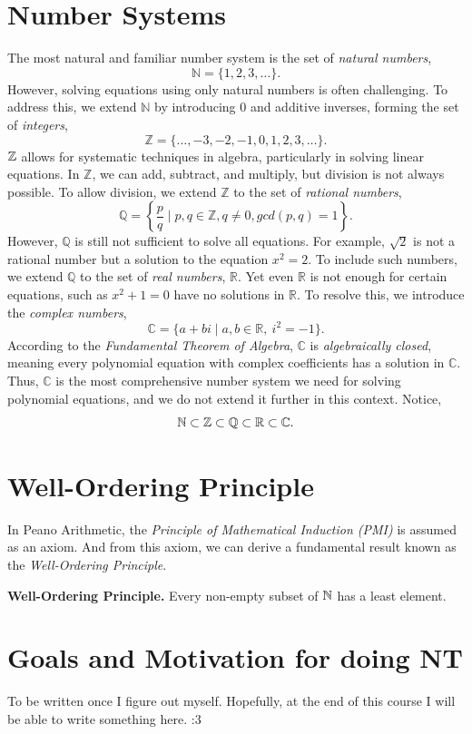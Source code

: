 \section{Number Systems}
The most natural and familiar number system is the set of \textit{natural numbers}, 
\[\mathbb{N} = \{1, 2, 3, \dots\}.
\]
However, solving equations using only natural numbers is often challenging. To address this, we extend $\mathbb{N}$ by introducing $0$ and additive inverses, forming the set of \textit{integers}, 
\[
\mathbb{Z} = \{\dots, -3, -2, -1, 0, 1, 2, 3, \dots\}.
\]
$\mathbb{Z}$ allows for systematic techniques in algebra, particularly in solving linear equations. In $\mathbb{Z}$, we can add, subtract, and multiply, but division is not always possible. To allow division, we extend $\mathbb{Z}$ to the set of \textit{rational numbers}, 
\[
\mathbb{Q} = \left\{\frac{p}{q} \mid p, q \in \mathbb{Z}, q \neq 0, gcd(p,q)=1 \right\}.
\]
However, $\mathbb{Q}$ is still not sufficient to solve all equations. For example, $\sqrt{2}$ is not a rational number but a solution to the equation $x^2 = 2$. To include such numbers, we extend $\mathbb{Q}$ to the set of \textit{real numbers}, $\mathbb{R}$. 
Yet even $\mathbb{R}$ is not enough for certain equations, such as $x^2 + 1 = 0$ have no solutions in $\mathbb{R}$. To resolve this, we introduce the \textit{complex numbers}, 
\[
\mathbb{C} = \{a + bi \mid a, b \in \mathbb{R}, \ i^2 = -1\}.
\]
According to the \textit{Fundamental Theorem of Algebra}, $\mathbb{C}$ is \textit{algebraically closed}, meaning every polynomial equation with complex coefficients has a solution in $\mathbb{C}$. Thus, $\mathbb{C}$ is the most comprehensive number system we need for solving polynomial equations, and we do not extend it further in this context. Notice,
\[
\mathbb{N} \subset \mathbb{Z} \subset \mathbb{Q} \subset \mathbb{R} \subset \mathbb{C}.
\]
\section{Well-Ordering Principle}
In Peano Arithmetic, the \textit{Principle of Mathematical Induction (PMI)} is assumed as an axiom. And from this axiom, we can derive a fundamental result known as the \textit{Well-Ordering Principle}.

\textbf{Well-Ordering Principle.} Every non-empty subset of $\mathbb{N}$ has a least element.
\section{Goals and Motivation for doing NT}
To be written once I figure out myself. Hopefully, at the end of this course I will be able to write something here. :3